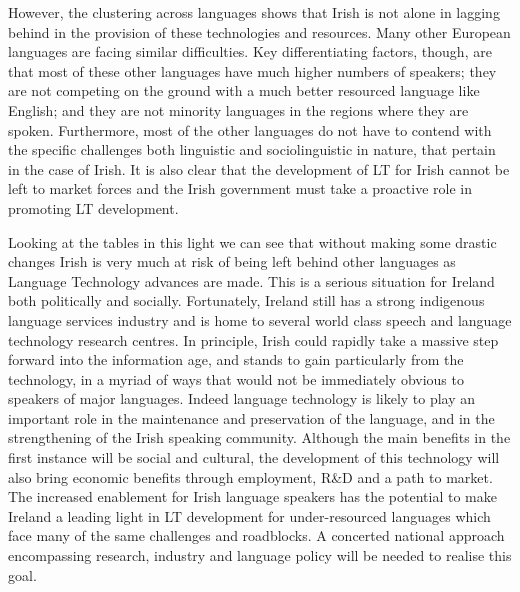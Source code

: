 \begin{multicols}{2}
However, the clustering across languages shows that Irish is not alone in lagging behind in the provision of these technologies and resources. Many other European languages are facing similar difficulties.  Key differentiating factors, though, are that most of these other languages have much higher numbers of speakers; they are not competing on the ground with a much better resourced language like English; and they are not minority languages in the regions where they are spoken. Furthermore, most of the other languages do not have to contend with the specific challenges both linguistic and sociolinguistic in nature, that pertain in the case of Irish. It is also clear that the development of LT for Irish cannot be left to market forces and the Irish government must take a proactive role in promoting LT development.

Looking at the tables in this light we can see that without making some drastic changes Irish is very much at risk of being left behind other languages as Language Technology advances are made. This is a serious situation for Ireland both politically and socially. Fortunately, Ireland still has a strong indigenous language services industry and is home to several world class speech and language technology research centres. In principle, Irish could rapidly take a massive step forward into the information age, and stands to gain particularly from the technology, in a myriad of ways that would not be immediately obvious to speakers of major languages. Indeed language technology is likely to play an important role in the maintenance and preservation of the language, and in the strengthening of the Irish speaking community. Although the main benefits in the first instance will be social and cultural, the development of this technology will also bring economic benefits through employment, R\&D and a path to market. The increased enablement for Irish language speakers has the potential to make Ireland a leading light in LT development for under-resourced languages which face many of the same challenges and roadblocks. A concerted national approach encompassing research, industry and language policy will be needed to realise this goal.



\end{multicols}
